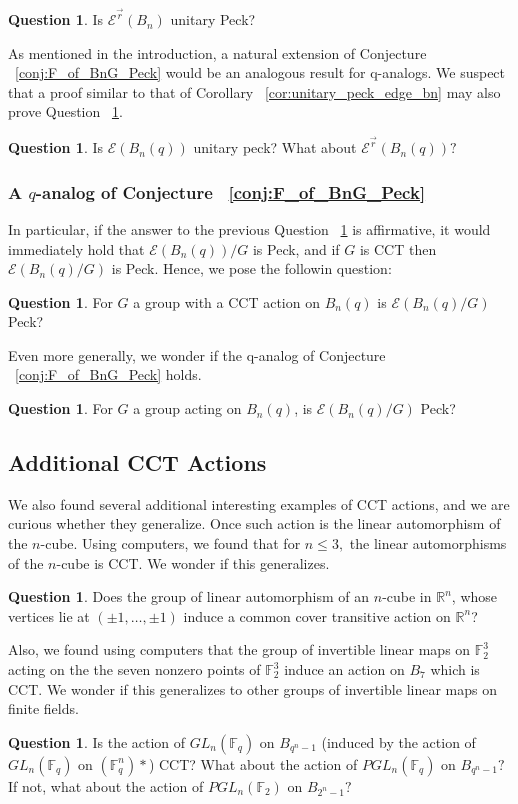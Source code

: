 \documentclass[10 pt]{amsart}
\theoremstyle{plain}
\theoremstyle{definition}
\newtheorem{question}[thm]{Question}
\theoremstyle{remark}
\numberwithin{equation}{section}
\newcommand\ssec{\subsection}
\newcommand\sssec{\subsubsection}
\newcommand\BF{{\mathbb F}}
\newcommand\BR{{\mathbb R}}
\renewcommand{\vec}[1]{\overrightarrow{#1}}
\begin{document}
\begin{question}
Is $\mathcal E^{\vec r}(B_n)$ unitary Peck?
\end{question}

As mentioned in the introduction, a natural extension of Conjecture ~\ref{conj:F_of_BnG_Peck} would be an analogous result for q-analogs. We suspect that a proof similar to that of Corollary ~\ref{cor:unitary_peck_edge_bn} may also prove Question ~\ref{question:unitary_peck_q_edge}.

\begin{question}
\label{question:unitary_peck_q_edge}
Is $\mathcal E(B_n(q))$ unitary peck? What about $\mathcal E^{\vec r}(B_n(q))?$
\end{question}

\sssec{A $q$-analog of Conjecture ~\ref{conj:F_of_BnG_Peck}}

In particular, if the answer to the previous Question ~\ref{question:unitary_peck_q_edge} is affirmative, it would immediately hold that $\mathcal E(B_n(q))/G$ is Peck, and if $G$ is CCT then $\mathcal E(B_n(q)/G)$ is Peck. Hence, we pose the followin question: 

\begin{question}
For $G$ a group with a CCT action on $B_n(q)$ is $\mathcal E(B_n(q)/G)$ Peck?
\end{question}

Even more generally, we wonder if the q-analog of Conjecture ~\ref{conj:F_of_BnG_Peck} holds.

\begin{question}
For $G$ a group acting on $B_n(q)$, is $\mathcal E(B_n(q)/G)$ Peck?
\end{question}

\ssec{Additional CCT Actions}

We also found several additional interesting examples of CCT actions, and we are curious whether they generalize. Once such action is the linear automorphism of the $n$-cube. Using computers, we found that for $n \leq 3,$ the linear automorphisms of the $n$-cube is CCT. We wonder if this generalizes.

\begin{question}
Does the group of linear automorphism of an $n$-cube in $\BR^n$, whose vertices lie at $(\pm 1, \ldots, \pm 1)$ induce a common cover transitive action on $\BR^n$?
\end{question}

Also, we found using computers that the group of invertible linear maps on $\BF_2^3$ acting on the the seven nonzero points of $\BF_2^3$ induce an action on $B_7$ which is CCT. We wonder if this generalizes to other groups of invertible linear maps on finite fields.

\begin{question}
Is the action of $GL_n(\BF_q)$ on $B_{q^n-1}$ (induced by the action of $GL_n(\BF_q)$ on $(\BF_q^n)*$) CCT? What about the action of $PGL_n(\BF_q)$ on $B_{q^n-1}?$ If not, what about the action of $PGL_n(\BF_2)$ on $B_{2^n-1}?$ 
\end{question}



\end{document}
